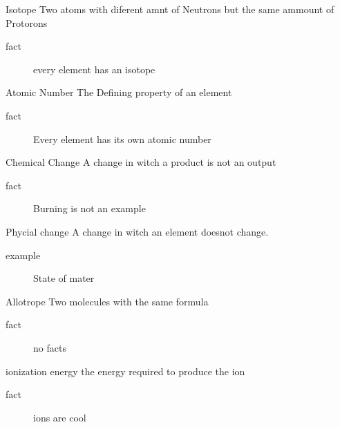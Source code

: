 \documentclass[avery5388,grid,frame]{flashcards}
\begin{document}
\begin{flashcard}[Definition]{Isotope}
  Two atoms with diferent amnt of Neutrons but the same ammount of Protorons
  \smallskip
  \begin{description}
    \item[fact] every element has an isotope
  \end{description}
\end{flashcard}

\begin{flashcard}[Definition]{Atomic Number}
  The Defining property of an element
  \smallskip
  \begin{description}
    \item[fact] Every element has its own atomic number
  \end{description}
\end{flashcard}

\begin{flashcard}[Definition]{Chemical Change}
  A change in witch a product is not an output
  \begin{description}
    \item[fact] Burning is not an example 
  \end{description}
\end{flashcard}

\begin{flashcard}[Definition]{Phycial change}
  A change in witch an element doesnot change.
  \begin{description}
    \item[example] State of mater
  \end{description}
\end{flashcard}

\begin{flashcard}[Definition]{Allotrope}
  Two molecules with the same formula
  \begin{description}
    \item[fact] no facts
  \end{description}
\end{flashcard}

\begin{flashcard}[Definition]{ionization energy}
  the energy required to produce the ion
  \begin{description}
    \item[fact] ions are cool
  \end{description}
\end{flashcard}
\end{document}
